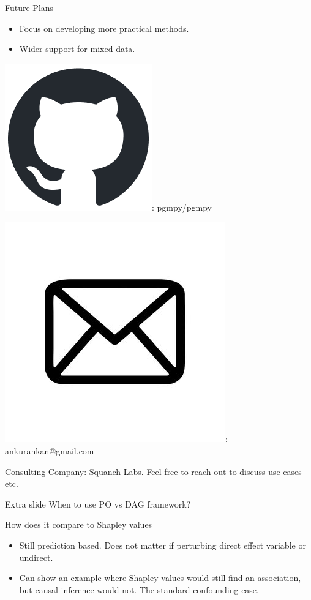 \documentclass{beamer}
\newcommand\github{\includegraphics[height=3ex]{imgs/github.png}}
\newcommand\email{\includegraphics[height=3ex]{imgs/email.png}}
\begin{document}
\begin{frame}{Future Plans}
	\begin{itemize}
		\item Focus on developing more practical methods.
		\item Wider support for mixed data.
	\end{itemize}
\end{frame}

\begin{frame}
	\vspace{5em}

	\github: pgmpy/pgmpy

	\email: ankurankan@gmail.com

	Consulting Company: Squanch Labs. Feel free to reach out to discuss use cases etc.
\end{frame}

\begin{frame}{Extra slide}
	When to use PO vs DAG framework?
\end{frame}

\begin{frame}
	How does it compare to Shapley values 
	\begin{itemize}
		\item Still prediction based. Does not matter if perturbing direct effect variable or undirect.
		\item Can show an example where Shapley values would still find an association, but causal inference would not. The standard confounding case.
	\end{itemize}
\end{frame}
\end{document}
